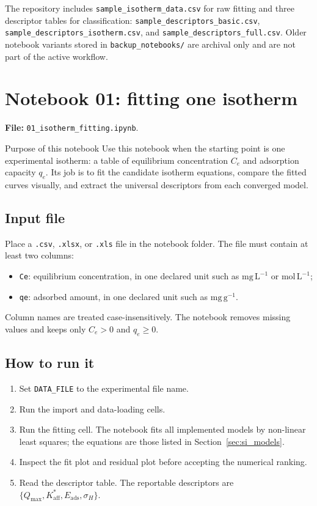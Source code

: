 \documentclass[journal=jacsat,manuscript=article]{achemso}
\begin{document}
The repository includes \texttt{sample\_isotherm\_data.csv} for raw fitting and
three descriptor tables for classification:
\texttt{sample\_descriptors\_basic.csv},
\texttt{sample\_descriptors\_isotherm.csv}, and
\texttt{sample\_descriptors\_full.csv}. Older notebook variants stored in
\texttt{backup\_notebooks/} are archival only and are not part of the active
workflow.

\appendix

\section{Notebook 01: fitting one isotherm}
\label{app:si_notebook_01}

\noindent\textbf{File:} \texttt{01\_isotherm\_fitting.ipynb}.

\begin{bluebox}{Purpose of this notebook}
	Use this notebook when the starting point is one experimental isotherm:
	a table of equilibrium concentration \(C_e\) and adsorption capacity
	\(q_e\). Its job is to fit the candidate isotherm equations, compare
	the fitted curves visually, and extract the universal descriptors from
	each converged model.
\end{bluebox}

\subsection*{Input file}

Place a \texttt{.csv}, \texttt{.xlsx}, or \texttt{.xls} file in the notebook
folder. The file must contain at least two columns:
\begin{itemize}
	\item \texttt{Ce}: equilibrium concentration, in one declared unit such as
	\(\mathrm{mg\,L^{-1}}\) or \(\mathrm{mol\,L^{-1}}\);
	\item \texttt{qe}: adsorbed amount, in one declared unit such as
	\(\mathrm{mg\,g^{-1}}\).
\end{itemize}
Column names are treated case-insensitively. The notebook removes missing
values and keeps only \(C_e>0\) and \(q_e\geq 0\).

\subsection*{How to run it}

\begin{enumerate}
	\item Set \texttt{DATA\_FILE} to the experimental file name.
	\item Run the import and data-loading cells.
	\item Run the fitting cell. The notebook fits all implemented models by
	non-linear least squares; the equations are those listed in
	Section~\ref{sec:si_models}.
	\item Inspect the fit plot and residual plot before accepting the numerical
	ranking.
	\item Read the descriptor table. The reportable descriptors are
	\(\{Q_{\max},K_{\mathrm{aff}}^{\ast},E_{\mathrm{ads}},\sigma_H\}\).
\end{enumerate}
\end{document}
